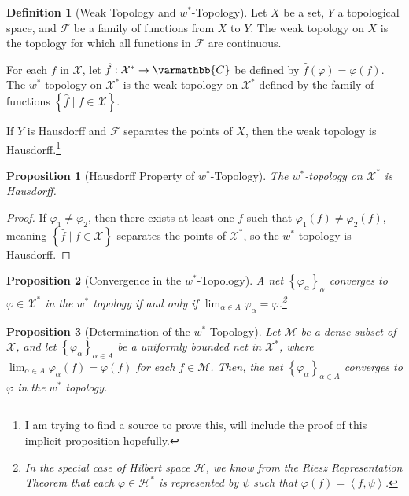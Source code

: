 \documentclass[10pt]{extarticle}
\newcommand{\C}{\mathbb{C}}
\newcommand{\iprod}[2]{\left\langle #1,#2\right\rangle}
\newcommand{\set}[1]{\left\{#1\right\}}
\theoremstyle{plain}
\newtheorem*{proposition}{Proposition}
\theoremstyle{definition}
\newtheorem*{definition}{Definition}
\theoremstyle{note}
\renewcommand*{\mathbb}[1]{\varmathbb{#1}}
\renewcommand{\newline}{\hfill\break}
\begin{document}
\begin{definition}[Weak Topology and $w^{\ast}$-Topology]
Let $X$ be a set, $Y$ a topological space, and $\mathcal{F}$ be a family of functions from $X$ to $Y$. The weak topology on $X$ is the topology for which all functions in $\mathcal{F}$ are continuous.\newline

For each $f$ in $\mathcal{X}$, let $\hat{f}: \mathcal{X}^{\ast}\rightarrow \C$ be defined by $\hat{f}(\varphi) = \varphi(f)$. The $w^{\ast}$-topology on $\mathcal{X}^{\ast}$ is the weak topology on $\mathcal{X}^{\ast}$ defined by the family of functions $\set{\hat{f}\mid f\in \mathcal{X}}$.\newline

If $Y$ is Hausdorff and $\mathcal{F}$ separates the points of $X$, then the weak topology is Hausdorff.\footnote{I am trying to find a source to prove this, will include the proof of this implicit proposition hopefully.}
\end{definition}
\begin{proposition}[Hausdorff Property of $w^{\ast}$-Topology]
  The $w^{\ast}$-topology on $\mathcal{X}^{\ast}$ is Hausdorff.
\end{proposition}
\begin{proof}
  If $\varphi_1 \neq \varphi_2$, then there exists at least one $f$ such that $\varphi_1(f) \neq \varphi_2(f)$, meaning $\set{\hat{f}\mid f\in \mathcal{X}}$ separates the points of $\mathcal{X}^{\ast}$, so the $w^{\ast}$-topology is Hausdorff.
\end{proof}
\begin{proposition}[Convergence in the $w^{\ast}$-Topology]
  A net $\set{\varphi_{\alpha}}_{\alpha}$ converges to $\varphi\in\mathcal{X}^{\ast}$ in the $w^{\ast}$ topology if and only if $\lim_{\alpha \in A}\varphi_{\alpha} = \varphi$.\footnote{In the special case of Hilbert space $\mathcal{H}$, we know from the Riesz Representation Theorem that each $\varphi\in \mathcal{H}^{\ast}$ is represented by $\psi$ such that $\varphi(f) = \iprod{f}{\psi}$.}
\end{proposition}
\begin{proposition}[Determination of the $w^{\ast}$-Topology]
  Let $\mathcal{M}$ be a dense subset of $\mathcal{X}$, and let $\set{\varphi_{\alpha}}_{\alpha\in A}$ be a uniformly bounded net in $\mathcal{X}^{\ast}$, where $\lim_{\alpha \in A}\varphi_{\alpha}(f) = \varphi(f)$ for each $f\in \mathcal{M}$. Then, the net $\set{\varphi_{\alpha}}_{\alpha \in A}$ converges to $\varphi$ in the $w^{\ast}$ topology.
\end{proposition}
\end{document}
